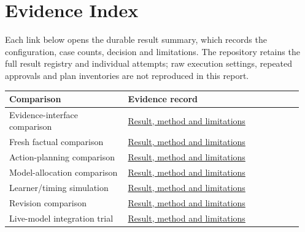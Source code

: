 \clearpage
\section{Evidence Index}\label{sec:study-index}
Each link below opens the durable result summary, which records the configuration,
case counts, decision and limitations. The repository retains the full result
registry and individual attempts; raw execution settings, repeated approvals and
plan inventories are not reproduced in this report.
\begin{longtable}{@{}L{0.38\linewidth}L{0.57\linewidth}@{}}
\toprule Comparison & Evidence record \\ \midrule
\endhead
{}\label{study-A}Evidence-interface comparison & \href{https://github.com/horiiiiii032929/digital-twin/blob/main/research/05_evaluation/course-digital-twin-whole-system-architecture-round-2-001-results.md}{Result, method and limitations} \\
\label{study-B}Fresh factual comparison & \href{https://github.com/horiiiiii032929/digital-twin/blob/main/research/05_evaluation/final-cross-method-factual-confirmation-001-results.md}{Result, method and limitations} \\
\label{study-C}Action-planning comparison & \href{https://github.com/horiiiiii032929/digital-twin/blob/main/research/05_evaluation/successor-architecture-confirmation-005-001-results.md}{Result, method and limitations} \\
\label{study-D}Model-allocation comparison & \href{https://github.com/horiiiiii032929/digital-twin/blob/main/research/05_evaluation/successor-architecture-engine-comparison-006-001-results.md}{Result, method and limitations} \\
\label{study-E}Learner/timing simulation & \href{https://github.com/horiiiiii032929/digital-twin/blob/main/research/05_evaluation/successor-learner-timing-simulation-001-results.md}{Result, method and limitations} \\
\label{study-F}Revision comparison & \href{https://github.com/horiiiiii032929/digital-twin/blob/main/research/05_evaluation/independent-factual-revision-controls-001-fresh-v16-live-001-results.md}{Result, method and limitations} \\
\label{study-G}Live-model integration trial & \href{https://github.com/horiiiiii032929/digital-twin/blob/main/research/05_evaluation/final-profile-operational-dialogue-development-001-full-live-001-results.md}{Result, method and limitations} \\

\end{longtable}
